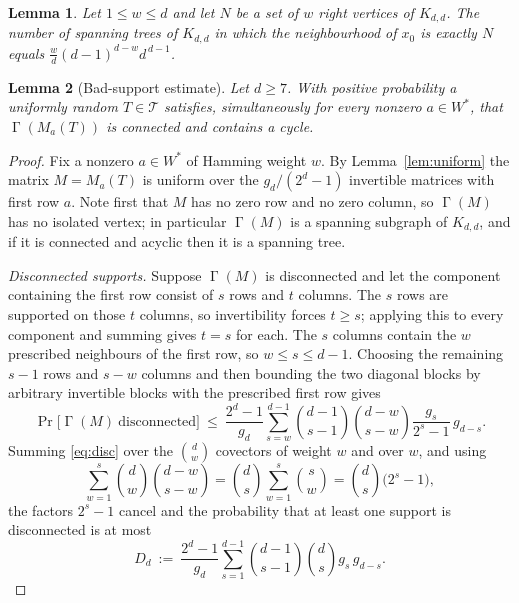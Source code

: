 \documentclass[10pt,a4paper]{amsart}
\newtheorem{lemma}{Lemma}
\DeclareMathOperator{\Gam}{\Gamma}
\begin{document}
\begin{lemma}\label{lem:trees}
Let $1\le w\le d$ and let $N$ be a set of $w$ right vertices of $K_{d,d}$. The number of spanning trees of $K_{d,d}$ in which the neighbourhood of $x_{0}$ is exactly $N$ equals $\tfrac{w}{d}(d-1)^{d-w}d^{\,d-1}$.
\end{lemma}

\begin{lemma}[Bad-support estimate]\label{lem:bad}
Let $d\ge 7$. With positive probability a uniformly random $T\in\mathcal{T}$ satisfies, simultaneously for every nonzero $a\in W^{*}$, that $\Gam(M_{a}(T))$ is connected and contains a cycle.
\end{lemma}

\begin{proof}
Fix a nonzero $a\in W^{*}$ of Hamming weight $w$. By Lemma~\ref{lem:uniform} the matrix $M=M_{a}(T)$ is uniform over the $g_{d}/(2^{d}-1)$ invertible matrices with first row $a$. Note first that $M$ has no zero row and no zero column, so $\Gam(M)$ has no isolated vertex; in particular $\Gam(M)$ is a spanning subgraph of $K_{d,d}$, and if it is connected and acyclic then it is a spanning tree.

\smallskip
\noindent\emph{Disconnected supports.} Suppose $\Gam(M)$ is disconnected and let the component containing the first row consist of $s$ rows and $t$ columns. The $s$ rows are supported on those $t$ columns, so invertibility forces $t\ge s$; applying this to every component and summing gives $t=s$ for each. The $s$ columns contain the $w$ prescribed neighbours of the first row, so $w\le s\le d-1$. Choosing the remaining $s-1$ rows and $s-w$ columns and then bounding the two diagonal blocks by arbitrary invertible blocks with the prescribed first row gives
\begin{equation}\label{eq:disc}
\Pr\bigl[\Gam(M)\ \text{disconnected}\bigr]\ \le\ \frac{2^{d}-1}{g_{d}}\sum_{s=w}^{d-1}\binom{d-1}{s-1}\binom{d-w}{s-w}\frac{g_{s}}{2^{s}-1}\,g_{d-s}.
\end{equation}
Summing \eqref{eq:disc} over the $\binom{d}{w}$ covectors of weight $w$ and over $w$, and using
\[
\sum_{w=1}^{s}\binom{d}{w}\binom{d-w}{s-w}=\binom{d}{s}\sum_{w=1}^{s}\binom{s}{w}=\binom{d}{s}\bigl(2^{s}-1\bigr),
\]
the factors $2^{s}-1$ cancel and the probability that at least one support is disconnected is at most
\begin{equation}\label{eq:Dd}
D_{d}\ :=\ \frac{2^{d}-1}{g_{d}}\sum_{s=1}^{d-1}\binom{d-1}{s-1}\binom{d}{s}g_{s}\,g_{d-s}.
\end{equation}


\end{proof}
\end{document}
